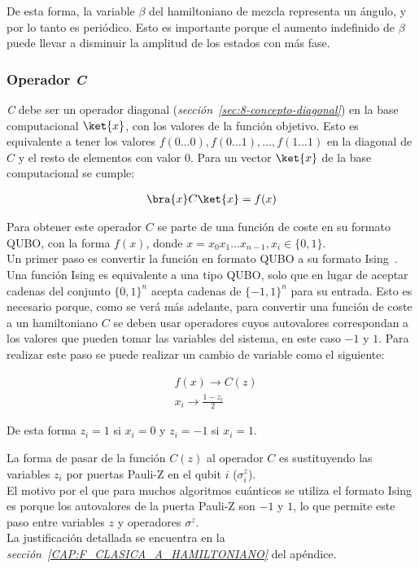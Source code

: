 De esta forma, la variable $\beta$ del hamiltoniano de mezcla representa un ángulo, y por lo tanto es periódico.
Esto es importante porque el aumento indefinido de $\beta$ puede llevar a disminuir la amplitud de los estados con más fase.


\subsubsection{Operador \textit{C}\label{sec:3-operador_c}}

\textit{C} debe ser un operador diagonal (\textit{sección~\ref{sec:8-concepto-diagonal}}) en la base computacional $\ket{x}$, con los valores de la función objetivo.
Esto es equivalente a tener los valores $f(0 \ldots 0), f(0 \ldots 1), \ldots, f(1 \ldots 1)$ en la diagonal de $C$ y el resto de elementos con valor 0.
Para un vector $\ket{x}$ de la base computacional se cumple:

\begin{align}
  \bra{x}C\ket{x} = f(x)
\end{align}

Para obtener este operador $C$ se parte de una función de coste en su formato QUBO, con la forma $f(x)$, donde $x=x_0x_1 \ldots x_{n-1}, x_i \in \{0, 1\}$.
\\
Un primer paso es convertir la función en formato QUBO a su formato Ising~\cite{ising_formulations_of_np_problems}.
Una función Ising es equivalente a una tipo QUBO, solo que en lugar de aceptar cadenas del conjunto ${\{0, 1\}}^n$ acepta cadenas de ${\{-1, 1\}}^n$ para su entrada.
Esto es necesario porque, como se verá más adelante, para convertir una función de coste a un hamiltoniano $C$ se deben usar operadores cuyos autovalores correspondan a los valores que pueden tomar las variables del sistema, en este caso $-1$ y $1$.
Para realizar este paso se puede realizar un cambio de variable como el siguiente:

\begin{align}
  &f(x) \rightarrow C(z) \\
  &x_i \rightarrow \frac{1 - z_i}{2} \nonumber
\end{align}

De esta forma $z_i = 1$ si $x_i = 0$ y $z_i = -1$ si $x_i = 1$.

La forma de pasar de la función $C(z)$ al operador $C$ es sustituyendo las variables $z_i$ por puertas Pauli-Z en el qubit $i$ ($\sigma^z_i$).
\\
El motivo por el que para muchos algoritmos cuánticos se utiliza el formato Ising es porque los autovalores de la puerta Pauli-Z son $-1$ y $1$, lo que permite este paso entre variables $z$ y operadores $\sigma^z$.
\\
La justificación detallada se encuentra en la \textit{sección~\ref{CAP:F_CLASICA_A_HAMILTONIANO}} del apéndice.

